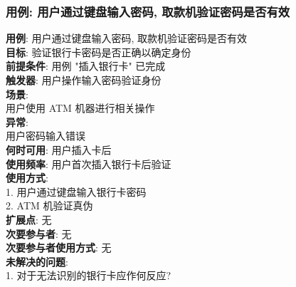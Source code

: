 \documentclass[UTF8]{article}
\begin{document}
\subsubsection{用例: 用户通过键盘输入密码, 取款机验证密码是否有效}
\noindent
\textbf{用例}: 用户通过键盘输入密码, 取款机验证密码是否有效
\\
\textbf{目标}: 验证银行卡密码是否正确以确定身份
\\
\textbf{前提条件}: 用例 "插入银行卡" 已完成
\\
\textbf{触发器}: 用户操作输入密码验证身份
\\
\textbf{场景}: \\
	\hspace*{2em} 用户使用 ATM 机器进行相关操作 \\
\textbf{异常}: \\
	\hspace*{2em} 用户密码输入错误 \\
\textbf{何时可用}: 用户插入卡后
\\
\textbf{使用频率}: 用户首次插入银行卡后验证
\\
\textbf{使用方式}:\\
	\hspace*{2em}1. 用户通过键盘输入银行卡密码 \\
	\hspace*{2em}2. ATM 机验证真伪 \\
\textbf{扩展点}: 无
\\
\textbf{次要参与者}: 无
\\
\textbf{次要参与者使用方式}: 无
\\
\textbf{未解决的问题}: \\
	\hspace*{2em}1. 对于无法识别的银行卡应作何反应?
	
\end{document}
